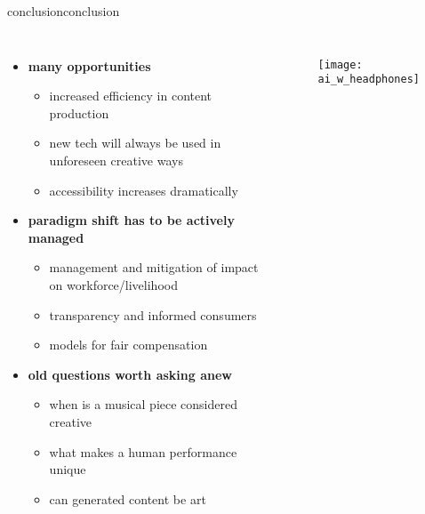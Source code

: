 \begin{frame}{conclusion}{conclusion}
    \vspace{-7mm}
    \begin{columns}
        \begin{itemize}
             \item   \textbf{many opportunities}
                \begin{itemize}
                    \item increased efficiency in content production
                    \item new tech will always be used in unforeseen creative ways
                    \item accessibility increases dramatically
                \end{itemize}
            \smallskip
           \item   \textbf{paradigm shift has to be actively managed}
                \begin{itemize}
                    \item management and mitigation of impact on workforce/livelihood
                    \item transparency and informed consumers
                    \item models for fair compensation
                \end{itemize}
            \smallskip
            \item   \textbf{old questions worth asking anew}
                \begin{itemize}
                    \item when is a musical piece considered creative
                    \item what makes a human performance unique
                    \item can generated content be art
                \end{itemize}
        \end{itemize}
        \vspace{10mm}
        \begin{figure}%
            \texttt{[image: ai\_w\_headphones]}%
        \end{figure}
    \end{columns}
\end{frame}